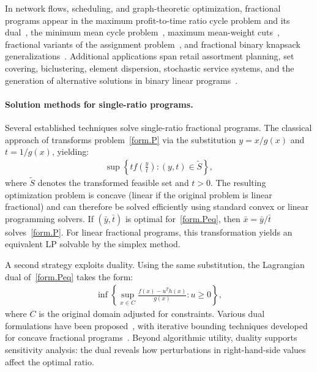 In network flows, scheduling, and graph-theoretic optimization,
fractional programs appear in the maximum profit-to-time ratio cycle
problem and its dual~\citep{AhujaBook, Dantzig1967, Fox1969,
Lawler1967a, megiddo1979combinatorial, Megiddo1983}, the
minimum mean cycle problem~\citep{AhujaBook, Karp1978, Lawler1967a},
maximum mean-weight cuts~\citep{Radzik1993, Iwano1994, Ervolina1993},
fractional variants of the assignment
problem~\citep{shigeno1995algorithm}, and fractional binary knapsack
generalizations~\citep{Ishii1976, Hashizume1987}. Additional
applications span retail assortment planning, set covering,
biclustering, element dispersion, stochastic service systems, and the
generation of alternative solutions in binary linear
programs~\citep{borrero2017survey, radzik1998fractional}.

\paragraph{Solution methods for single-ratio programs.}
Several established techniques solve single-ratio fractional programs.
The classical approach of \cite{charnes1962} transforms
problem~\eqref{form.P} via the substitution $y = x / g(x)$ and
$t = 1 / g(x)$, yielding:
\begin{align}
\label{form.Peq}
    \sup \left\{ t f\left( \frac{y}{t} \right) :
        (y,t) \in \tilde{S} \right\},
\end{align}
where $\tilde{S}$ denotes the transformed feasible set and $t > 0$.
The resulting optimization problem is concave (linear if the original problem is linear fractional) and can therefore be solved efficiently using standard convex or linear programming solvers. If $(\bar{y}, \bar{t})$ is optimal for~\eqref{form.Peq}, then $\bar{x} = \bar{y} / \bar{t}$ solves~\eqref{form.P}. For linear fractional programs, this
transformation yields an equivalent LP solvable by the simplex method.

A second strategy exploits duality. Using the same substitution, the
Lagrangian dual of~\eqref{form.Peq} takes the form:
\begin{align}
\label{form.D}
     \inf \left\{ \sup_{x \in C} \frac{f(x) - u^T h(x)}{g(x)} :
         u \ge 0 \right\},
\end{align}
where $C$ is the original domain adjusted for constraints. Various
dual formulations have been proposed~\citep{schaible1978analyse,
schaible1983fractional}, with iterative bounding techniques developed
for concave fractional programs~\citep{schaible1976fractional}. Beyond
algorithmic utility, duality supports sensitivity analysis: the dual
reveals how perturbations in right-hand-side values affect the optimal
ratio.

